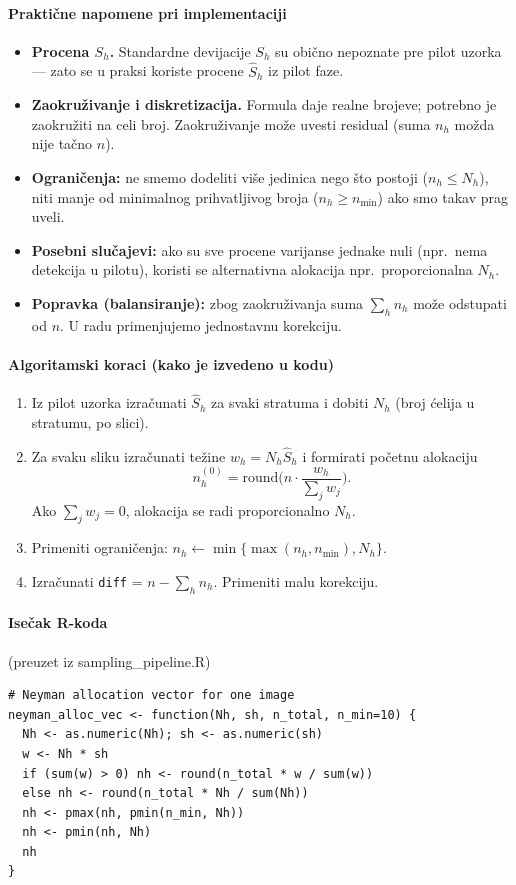 \documentclass[a4paper,12pt]{article}
\begin{document}
\paragraph{Praktične napomene pri implementaciji}
\begin{itemize}
  \item \textbf{Procena $S_h$.} Standardne devijacije $S_h$ su obično nepoznate pre pilot uzorka — zato se u praksi koriste procene $\hat S_h$ iz pilot faze.
  \item \textbf{Zaokruživanje i diskretizacija.} Formula daje realne brojeve; potrebno je zaokružiti na celi broj. Zaokruživanje može uvesti residual (suma $n_h$ možda nije tačno $n$).
  \item \textbf{Ograničenja:} ne smemo dodeliti više jedinica nego što postoji ($n_h \le N_h$), niti manje od minimalnog prihvatljivog broja ($n_h \ge n_{\min}$) ako smo takav prag uveli.
  \item \textbf{Posebni slučajevi:} ako su sve procene varijanse jednake nuli (npr.\ nema detekcija u pilotu), koristi se alternativna alokacija npr.\ proporcionalna $N_h$.
  \item \textbf{Popravka (balansiranje):} zbog zaokruživanja suma $\sum_h n_h$ može odstupati od $n$. U radu primenjujemo jednostavnu korekciju.
\end{itemize}

\paragraph{Algoritamski koraci (kako je izvedeno u kodu)}
\begin{enumerate}
  \item Iz pilot uzorka izračunati $\hat S_h$ za svaki stratuma i dobiti $N_h$ (broj ćelija u stratumu, po slici).
  \item Za svaku sliku izračunati težine $w_h = N_h \hat S_h$ i formirati početnu alokaciju
  \[
  n_h^{(0)} = \mathrm{round}\!\Big( n \cdot \frac{w_h}{\sum_j w_j} \Big).
  \]
  Ako $\sum_j w_j = 0$, alokacija se radi proporcionalno $N_h$.
  \item Primeniti ograničenja: $n_h \leftarrow \min\{ \max(n_h, n_{\min}), N_h\}$.
  \item Izračunati \texttt{diff} = $n - \sum_h n_h$. Primeniti malu korekciju.
\end{enumerate}

\paragraph{Isečak R-koda} (preuzet iz sampling\_pipeline.R)
\begin{verbatim}
# Neyman allocation vector for one image
neyman_alloc_vec <- function(Nh, sh, n_total, n_min=10) {
  Nh <- as.numeric(Nh); sh <- as.numeric(sh)
  w <- Nh * sh
  if (sum(w) > 0) nh <- round(n_total * w / sum(w)) 
  else nh <- round(n_total * Nh / sum(Nh))
  nh <- pmax(nh, pmin(n_min, Nh))
  nh <- pmin(nh, Nh)
  nh
}
\end{verbatim}
\end{document}
